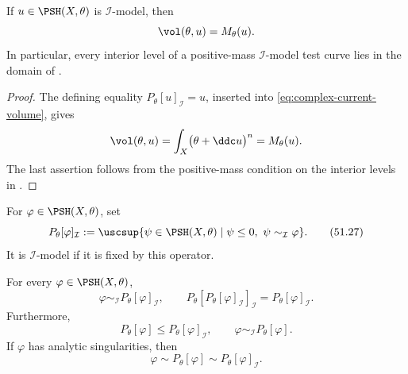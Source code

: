 \begin{lemma}\label{lem:ok-i-model-mass-volume}
If \(u\in\PSH(X,\theta)\) is \(\mathcal I\)-model, then
\[
                         \vol(\theta,u)=M_\theta(u).
\]
In particular, every interior level of a positive-mass
\(\mathcal I\)-model test curve lies in the domain of
.
\end{lemma}

\begin{proof}
The defining equality \(P_\theta[u]_{\mathcal I}=u\), inserted into
\eqref{eq:complex-current-volume}, gives
\[
 \vol(\theta,u)
 =\int_X\bigl(\theta+\ddc u\bigr)^n
 =M_\theta(u).
\]
The last assertion follows from the positive-mass condition on the interior
levels in .
\end{proof}

\begin{definition}
\label{def:complex-i-envelope}
For \(\varphi\in\PSH(X,\theta)\), set
\[
 P_\theta[\varphi]_{\mathcal I}
 :=\uscsup\{\psi\in\PSH(X,\theta)\mid
          \psi\leq0,\ \psi\sim_{\mathcal I}\varphi\}.
\tag{51.27}\label{eq:complex-i-envelope}
\]
It is \(\mathcal I\)-model if it is fixed by this operator.
\end{definition}

\begin{theorem}\label{thm:complex-i-projection}
For every \(\varphi\in\PSH(X,\theta)\),
\[
 \varphi\sim_{\mathcal I}P_\theta[\varphi]_{\mathcal I},
\qquad
 P_\theta[P_\theta[\varphi]_{\mathcal I}]_{\mathcal I}
      =P_\theta[\varphi]_{\mathcal I}.
\tag{51.28}\label{eq:complex-i-projection}
\]
Furthermore,
\[
 P_\theta[\varphi]\leq P_\theta[\varphi]_{\mathcal I},
\qquad
 \varphi\sim_{\mathcal I}P_\theta[\varphi].
\tag{51.29}\label{eq:complex-p-i-comparison}
\]
If \(\varphi\) has analytic singularities, then
\[
 \varphi\sim P_\theta[\varphi]
        \sim P_\theta[\varphi]_{\mathcal I}.
\tag{51.30}\label{eq:complex-analytic-envelope-agreement}
\]
\end{theorem}

